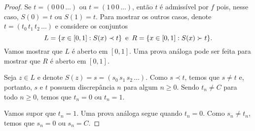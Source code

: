 \begin{proof}
Se $t = (0\, 0\, 0\, \dots)$ ou $t = (1\, 0\, 0\, \dots)$, então $t$ é admissível por $f$ pois, nesse caso, $S(0) = t$ ou $S(1) = t$. Para mostrar os outros casos, denote $t = (t_0\, t_1\, t_2\, \dots)$ e considere os conjuntos 
$$L = \{ x \in [0, 1] : S(x) \prec t \} \text{\, e \,} R = \{ x \in [0, 1] : S(x) \succ t \}.$$
Vamos mostrar que $L$ é aberto em $[0, 1]$. Uma prova análoga pode ser feita para mostrar que $R$ é aberto em $[0, 1]$.

Seja $z \in L$ e denote $S(z) = s = (s_0 \, s_1 \, s_2 \, \dots)$. Como $s \prec t$, temos que $s \neq t$ e, portanto, $s$ e $t$ possuem discrepância $n$ para algum $n \geq 0$. Sendo $t_n \neq C$ para todo $n \geq 0$, temos que $t_n = 0$ ou $t_n = 1$.

Vamos supor que $t_n = 1$. Uma prova análoga segue quando $t_n = 0$. Como $s_n \neq t_n$, temos que $s_n = 0$ ou $s_n = C$. 
\end{proof}












